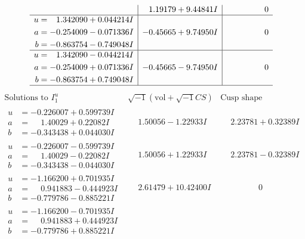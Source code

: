 \documentclass[1p]{elsarticle_modified}
\theoremstyle{definition}
\newcommand{\I}{\sqrt{-1}}
\begin{document}
$$\begin{array}{c|c|c}
 & \phantom{-}1.19179 + 9.44841 I & \phantom{-0.000000 } 0 \\ \hline\begin{aligned}
u &= \phantom{-}1.342090 + 0.044214 I \\
a &= -0.254009 - 0.071336 I \\
b &= -0.863754 - 0.749048 I\end{aligned}
 & -0.45665 + 9.74950 I & \phantom{-0.000000 } 0 \\ \hline\begin{aligned}
u &= \phantom{-}1.342090 - 0.044214 I \\
a &= -0.254009 + 0.071336 I \\
b &= -0.863754 + 0.749048 I\end{aligned}
 & -0.45665 - 9.74950 I & \phantom{-0.000000 } 0\\
 \hline 
 \end{array}$$\newpage$$\begin{array}{c|c|c}  
\text{Solutions to }I^u_{1}& \I (\text{vol} + \sqrt{-1}CS) & \text{Cusp shape}\\
 \hline 
\begin{aligned}
u &= -0.226007 + 0.599739 I \\
a &= \phantom{-}1.40029 + 0.22082 I \\
b &= -0.343438 + 0.044030 I\end{aligned}
 & \phantom{-}1.50056 - 1.22933 I & \phantom{-}2.23781 + 0.32389 I \\ \hline\begin{aligned}
u &= -0.226007 - 0.599739 I \\
a &= \phantom{-}1.40029 - 0.22082 I \\
b &= -0.343438 - 0.044030 I\end{aligned}
 & \phantom{-}1.50056 + 1.22933 I & \phantom{-}2.23781 - 0.32389 I \\ \hline\begin{aligned}
u &= -1.166200 + 0.701935 I \\
a &= \phantom{-}0.941883 - 0.444923 I \\
b &= -0.779786 - 0.885221 I\end{aligned}
 & \phantom{-}2.61479 + 10.42400 I & \phantom{-0.000000 } 0 \\ \hline\begin{aligned}
u &= -1.166200 - 0.701935 I \\
a &= \phantom{-}0.941883 + 0.444923 I \\
b &= -0.779786 + 0.885221 I\end{aligned}

\end{array}$$
\end{document}
